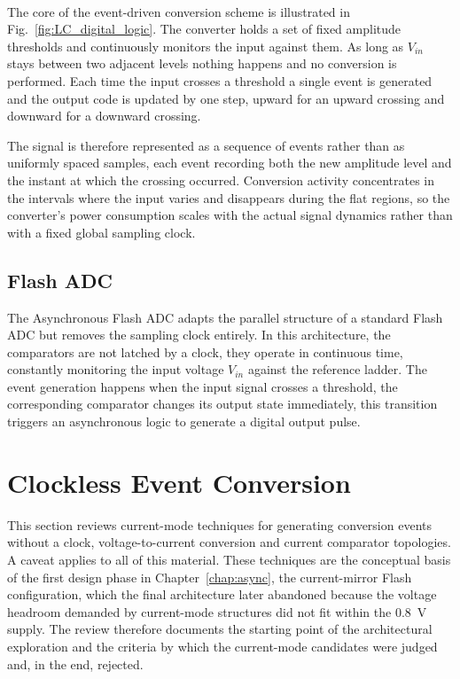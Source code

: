 \paragraph{}
\paragraph{}
The core of the event-driven conversion scheme is illustrated in Fig.~\ref{fig:LC_digital_logic}. The converter holds a set of fixed amplitude thresholds and continuously monitors the input against them. As long as $V_{in}$ stays between two adjacent levels nothing happens and no conversion is performed. Each time the input crosses a threshold a single event is generated and the output code is updated by one step, upward for an upward crossing and downward for a downward crossing.

The signal is therefore represented as a sequence of events rather than as uniformly spaced samples, each event recording both the new amplitude level and the instant at which the crossing occurred. Conversion activity concentrates in the intervals where the input varies and disappears during the flat regions, so the converter's power consumption scales with the actual signal dynamics rather than with a fixed global sampling clock.
\subsection{Flash ADC}
The Asynchronous Flash ADC adapts the parallel structure of a standard Flash ADC but removes the sampling clock entirely. In this architecture, the comparators are not latched by a clock, they operate in continuous time, constantly monitoring the input voltage $V_{in}$ against the reference ladder.
The event generation happens when the input signal crosses a threshold, the corresponding comparator changes its output state immediately, this transition triggers an asynchronous logic to generate a digital output pulse.

\section{Clockless Event Conversion}
\label{sec:clockless_event}

This section reviews current-mode techniques for generating conversion events without a clock, voltage-to-current conversion and current comparator topologies. A caveat applies to all of this material. These techniques are the conceptual basis of the first design phase in Chapter~\ref{chap:async}, the current-mirror Flash configuration, which the final architecture later abandoned because the voltage headroom demanded by current-mode structures did not fit within the $0.8$~V supply. The review therefore documents the starting point of the architectural exploration and the criteria by which the current-mode candidates were judged and, in the end, rejected.

